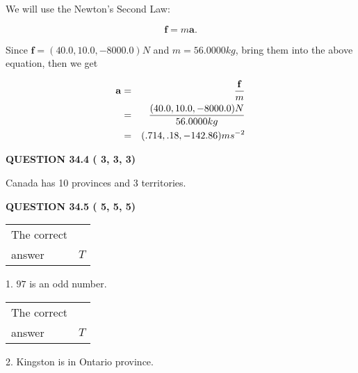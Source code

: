 \documentclass[12pt]{article}
\begin{document}
 
 
 
 
\noindent{}

We will use the Newton's Second Law:
 
\[
\mathbf{f}=m\mathbf{a}.
\]
 
Since $\mathbf{f}= %
(40.0 , 10.0 , -8000.0) N$
and $m= %
56.0000kg$, bring them into the above equation, then we get
 
\begin{eqnarray*}
\mathbf{a}&=&\frac{\mathbf{f}}m  \\
&=&\frac{ %
(40.0 , 10.0 , -8000.0) N}{ %
56.0000kg}  \\
&=& %
(.714 , .18 , -142.86) ms^{-2}
\end{eqnarray*}
 
 
 
  
\vspace{0.2in}
  
{\textbf{\Large{QUESTION
34.4 
 (          3,          3,          3)
}}}
  
  
 
 
\noindent{}
 
 
Canada has  %
10 provinces and  %
3 territories.
 
 
 
 
  
\vspace{0.2in}
  
{\textbf{\Large{QUESTION
34.5 
 (          5,          5,          5)
}}}
  
  
 
 
\noindent{}

 
\noindent\begin{tabular}{|l|l|}\hline The correct & \\
          answer &  %
$T$ \\ \hline \end{tabular}
1. $ %
97$ is an  %
odd number.
 
\noindent\begin{tabular}{|l|l|}\hline The correct & \\
          answer &  %
$T$ \\ \hline \end{tabular}
2.  %
Kingston is in  %
Ontario province.
 
\end{document}
